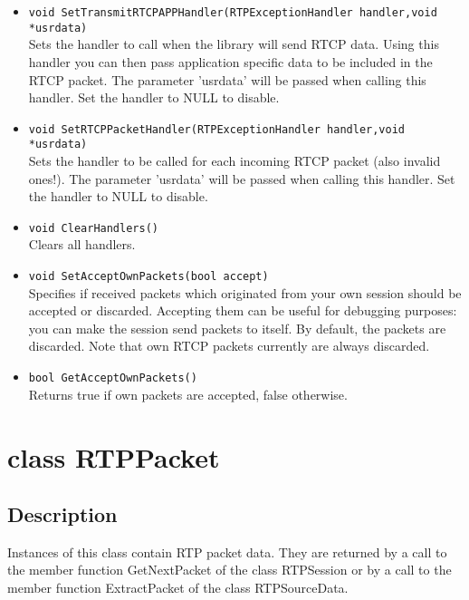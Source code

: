 \begin{itemize}
\item {\tt void SetTransmitRTCPAPPHandler(RTPExceptionHandler handler,void *usrdata)}\\
	Sets the handler to call when the library will send RTCP data. Using
	this handler you can then pass application specific data to be included
	in the RTCP packet. The parameter 'usrdata' will be passed when calling
	this handler. Set the handler to NULL to disable.

\item {\tt void SetRTCPPacketHandler(RTPExceptionHandler handler,void *usrdata)}\\
 	Sets the handler to be called for each incoming RTCP packet (also
 	invalid ones!). The parameter 'usrdata' will be passed when calling
 	this handler. Set the handler to NULL to disable.
	
\item {\tt void ClearHandlers()}\\
	Clears all handlers.

\item {\tt void SetAcceptOwnPackets(bool accept)}\\
	Specifies if received packets which originated from your own session
	should be accepted or discarded. Accepting them can be useful for
	debugging purposes: you can make the session send packets to itself.
	By default, the packets are discarded. Note that own RTCP packets
	currently are always discarded.

\item {\tt bool GetAcceptOwnPackets()}\\
	Returns true if own packets are accepted, false otherwise.

\end{itemize}
	

\section{class RTPPacket}

\subsection{Description}

Instances of this class contain RTP packet data. They are returned by a call
to the member function GetNextPacket of the class RTPSession or by a call to
the member function ExtractPacket of the class RTPSourceData.

